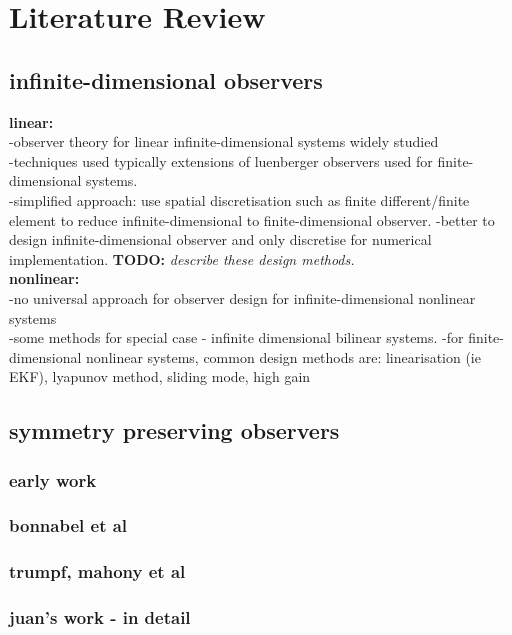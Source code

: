 \section{Literature Review}

\subsection{infinite-dimensional observers}
\textbf{linear:}\\
-observer theory for linear infinite-dimensional systems widely studied\\
-techniques used typically extensions of luenberger observers used for finite-dimensional systems.\\
-simplified approach: use spatial discretisation such as finite different/finite element to reduce infinite-dimensional to finite-dimensional observer. \cite{harkort2011finite,meirovitch1983problem}
-better to design infinite-dimensional observer and only discretise for numerical implementation. \cite{haine2014recovering,helton1976systems,ramdani2010recovering} \textbf{TODO:} \textit{describe these design methods.}\\
\textbf{nonlinear:}\\ 
-no universal approach for observer design for infinite-dimensional nonlinear systems\\
-some methods for special case - infinite dimensional bilinear systems. \cite{xu1995observer,bounit1997observers}
-for finite-dimensional nonlinear systems, common design methods are: linearisation (ie EKF), lyapunov method, sliding mode, high gain
\subsection{symmetry preserving observers}
\subsubsection{early work}
\subsubsection{bonnabel et al}
\subsubsection{trumpf, mahony et al}
\subsubsection{juan's work - in detail}
